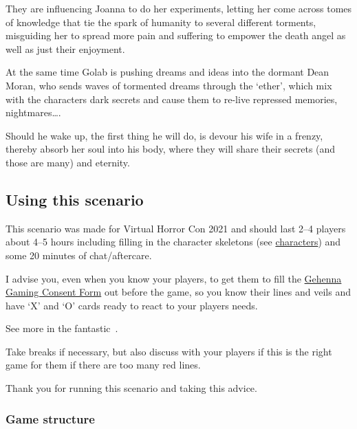 They are influencing Joanna to do her experiments, letting her come across tomes of knowledge that
tie the spark of humanity to several different torments, misguiding her to spread more pain and
suffering to empower the death angel as well as just their enjoyment.

At the same time Golab is pushing dreams and ideas into the dormant Dean Moran, who sends waves of tormented
dreams through the  ‘ether’, which mix with the characters dark secrets and cause them to re-live repressed memories,
nightmares….

Should he wake up, the first thing he will do, is devour his wife in a frenzy, thereby absorb her soul into his body, where
they will share their secrets (and those are many) and eternity.

\subsection{Using this scenario}%
\label{sub:using_this_scenario}

This scenario was made for Virtual Horror Con 2021 and should last 2--4 players about 4--5 hours including filling in the
character skeletons (see \hyperref[sec:pre_made_characters]{characters}) and some 20 minutes of chat/aftercare.

I advise you, even when you know your players, to get them to fill the
\href{https://www.gehennagaming.com/wp-content/uploads/2020/05/Gehenna-Gaming-Consent-Form.pdf}{Gehenna Gaming Consent Form}
out before the game, so you know their lines and veils and have ‘X’ and ‘O’ cards ready to react to your players needs.

See more in the fantastic~\cite{TTRPG_safety_toolkit}.

Take breaks if necessary, but also discuss with your players if this is the right game for them if there are too many red lines.


Thank you for running this scenario and taking this advice.

\subsubsection{Game structure}%
\label{ssub:game_structure}

